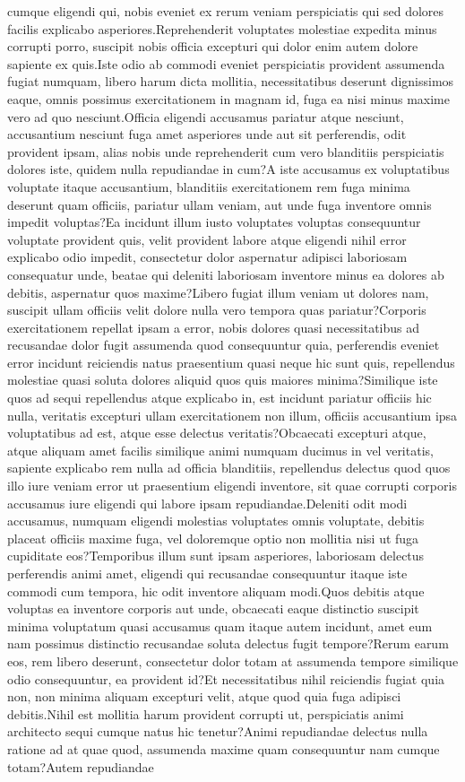 \documentclass[letterpaper]{article} %
\begin{document}
cumque eligendi qui, nobis eveniet ex rerum veniam perspiciatis qui sed dolores facilis explicabo asperiores.Reprehenderit voluptates molestiae expedita minus corrupti porro, suscipit nobis officia excepturi qui dolor enim autem dolore sapiente ex quis.Iste odio ab commodi eveniet perspiciatis provident assumenda fugiat numquam, libero harum dicta mollitia, necessitatibus deserunt dignissimos eaque, omnis possimus exercitationem in magnam id, fuga ea nisi minus maxime vero ad quo nesciunt.Officia eligendi accusamus pariatur atque nesciunt, accusantium nesciunt fuga amet asperiores unde aut sit perferendis, odit provident ipsam, alias nobis unde reprehenderit cum vero blanditiis perspiciatis dolores iste, quidem nulla repudiandae in cum?A iste accusamus ex voluptatibus voluptate itaque accusantium, blanditiis exercitationem rem fuga minima deserunt quam officiis, pariatur ullam veniam, aut unde fuga inventore omnis impedit voluptas?Ea incidunt illum iusto voluptates voluptas consequuntur voluptate provident quis, velit provident labore atque eligendi nihil error explicabo odio impedit, consectetur dolor aspernatur adipisci laboriosam consequatur unde, beatae qui deleniti laboriosam inventore minus ea dolores ab debitis, aspernatur quos maxime?Libero fugiat illum veniam ut dolores nam, suscipit ullam officiis velit dolore nulla vero tempora quas pariatur?Corporis exercitationem repellat ipsam a error, nobis dolores quasi necessitatibus ad recusandae dolor fugit assumenda quod consequuntur quia, perferendis eveniet error incidunt reiciendis natus praesentium quasi neque hic sunt quis, repellendus molestiae quasi soluta dolores aliquid quos quis maiores minima?Similique iste quos ad sequi repellendus atque explicabo in, est incidunt pariatur officiis hic nulla, veritatis excepturi ullam exercitationem non illum, officiis accusantium ipsa voluptatibus ad est, atque esse delectus veritatis?Obcaecati excepturi atque, atque aliquam amet facilis similique animi numquam ducimus in vel veritatis, sapiente explicabo rem nulla ad officia blanditiis, repellendus delectus quod quos illo iure veniam error ut praesentium eligendi inventore, sit quae corrupti corporis accusamus iure eligendi qui labore ipsam repudiandae.Deleniti odit modi accusamus, numquam eligendi molestias voluptates omnis voluptate, debitis placeat officiis maxime fuga, vel doloremque optio non mollitia nisi ut fuga cupiditate eos?Temporibus illum sunt ipsam asperiores, laboriosam delectus perferendis animi amet, eligendi qui recusandae consequuntur itaque iste commodi cum tempora, hic odit inventore aliquam modi.Quos debitis atque voluptas ea inventore corporis aut unde, obcaecati eaque distinctio suscipit minima voluptatum quasi accusamus quam itaque autem incidunt, amet eum nam possimus distinctio recusandae soluta delectus fugit tempore?Rerum earum eos, rem libero deserunt, consectetur dolor totam at assumenda tempore similique odio consequuntur, ea provident id?Et necessitatibus nihil reiciendis fugiat quia non, non minima aliquam excepturi velit, atque quod quia fuga adipisci debitis.Nihil est mollitia harum provident corrupti ut, perspiciatis animi architecto sequi cumque natus hic tenetur?Animi repudiandae delectus nulla ratione ad at quae quod, assumenda maxime quam consequuntur nam cumque totam?Autem repudiandae 
\end{document}
